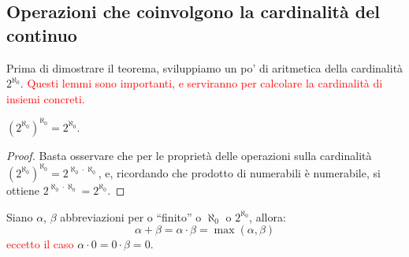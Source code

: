 \subsection{Operazioni che coinvolgono la cardinalità del continuo}
Prima di dimostrare il teorema, sviluppiamo un po' di aritmetica della cardinalità $2^{\aleph_0}$. \textcolor{red}{Questi lemmi sono importanti, e serviranno per calcolare 
la cardinalità di insiemi concreti.}

\begin{remark}
	$(2^{\aleph_0})^{\aleph_0} = 2^{\aleph_0}$.
\end{remark}

\begin{proof}
	Basta osservare che per le proprietà delle operazioni sulla cardinalità $(2^{\aleph_0})^{\aleph_0} = 2^{\aleph_0 \cdot \aleph_0}$, e, ricordando
	che prodotto di numerabili è numerabile, si ottiene $2^{\aleph_0 \cdot \aleph_0} = 2^{\aleph_0}$.
\end{proof}

\begin{lemma}
	\label{prodotto_cardinali_senza_AC}
	Siano $\alpha$, $\beta$ abbreviazioni per o ``finito'' o $\aleph_0$ o $2^{\aleph_0}$, allora:
	\[ \alpha + \beta = \alpha \cdot \beta = \max(\alpha,\beta)
		\]
	\textcolor{red}{eccetto il caso} $\alpha \cdot 0 = 0 \cdot \beta = 0$.
\end{lemma}

